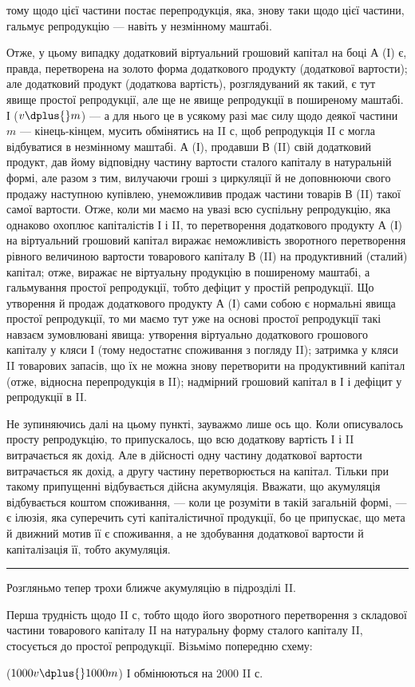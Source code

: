 \parcont{}  %
тому щодо цієї частини постає перепродукція, яка, знову таки щодо цієї
частини, гальмує репродукцію — навіть у незмінному маштабі.

Отже, у цьому випадку додатковий віртуальний грошовий капітал на
боці $А$ (І) є, правда, перетворена на золото форма додаткового продукту
(додаткової вартости); але додатковий продукт (додаткова вартість), розглядуваний
як такий, є тут явище простої репродукції, але ще не явище
репродукції в поширеному маштабі. І ($v \dplus{} m$) — а для нього це в усякому
разі має силу щодо деякої частини $m$ — кінець-кінцем, мусить обмінятись
на II $с$, щоб репродукція II с могла відбуватися в незмінному маштабі.
$А$ (І), продавши $В$ (II) свій додатковий продукт, дав йому відповідну
частину вартости сталого капіталу в натуральній формі, але разом з тим,
вилучаючи гроші з циркуляції й не доповнюючи свого продажу наступною
купівлею, унеможливив продаж частини товарів $В$ (II) такої самої
вартости. Отже, коли ми маємо на увазі всю суспільну репродукцію, яка
однаково охоплює капіталістів І і II, то перетворення додаткового продукту
$А$ (І) на віртуальний грошовий капітал виражає неможливість зворотного
перетворення рівного величиною вартости товарового капіталу
$В$ (II) на продуктивний (сталий) капітал; отже, виражає не віртуальну
продукцію в поширеному маштабі, а гальмування простої репродукції,
тобто дефіцит у простій репродукції. Що утворення й продаж додаткового
продукту $А$ (І) сами собою є нормальні явища простої репродукції,
то ми маємо тут уже на основі простої репродукції такі навзаєм зумовлювані
явища: утворення віртуально додаткового грошового капіталу у
кляси І (тому недостатнє споживання з погляду II); затримка у кляси II
товарових запасів, що їх не можна знову перетворити на продуктивний
капітал (отже, відносна перепродукція в II); надмірний грошовий капітал
в І і дефіцит у репродукції в II.

Не зупиняючись далі на цьому пункті, зауважмо лише ось що.
Коли описувалось просту репродукцію, то припускалось, що всю додаткову
вартість І і II витрачається як дохід. Але в дійсності одну частину
додаткової вартости витрачається як дохід, а другу частину перетворюється
на капітал. Тільки при такому припущенні відбувається дійсна
акумуляція. Вважати, що акумуляція відбувається коштом споживання, —
коли це розуміти в такій загальній формі, — є ілюзія, яка суперечить суті
капіталістичної продукції, бо це припускає, що мета й движний мотив
її є споживання, а не здобування додаткової вартости й капіталізація її,
тобто акумуляція.

\pfbreak

Розгляньмо тепер трохи ближче акумуляцію в підрозділі II.

Перша трудність щодо II $с$, тобто щодо його зворотного перетворення
з складової частини товарового капіталу II на натуральну форму
сталого капіталу II, стосується до простої репродукції. Візьмімо попередню
схему:
\begin{center}
  ($1000 v \dplus{} 1000 m$) І обмінюються на
  2000 II $с$.
\end{center}
